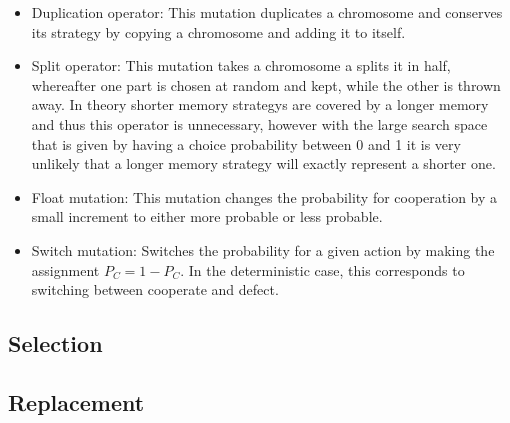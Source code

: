 \begin{itemize}
\item Duplication operator: This mutation duplicates a chromosome and conserves its strategy by copying a chromosome and adding it to itself.
\item Split operator: This mutation takes a chromosome a splits it in half, whereafter one part is chosen at random and kept, while the other is thrown away. In theory shorter memory strategys are covered by a longer memory and thus this operator is unnecessary, however with the large search space that is given by having a choice probability between 0 and 1 it is very unlikely that a longer memory strategy will exactly represent a shorter one.
\item Float mutation: This mutation changes the probability for cooperation by a small increment to either more probable or less probable.
\item Switch mutation: Switches the probability for a given action by making the assignment $P_{C} = 1 - P_{C}$. In the deterministic case, this corresponds to switching between cooperate and defect.
\end{itemize}



\subsection{Selection}

\subsection{Replacement}



